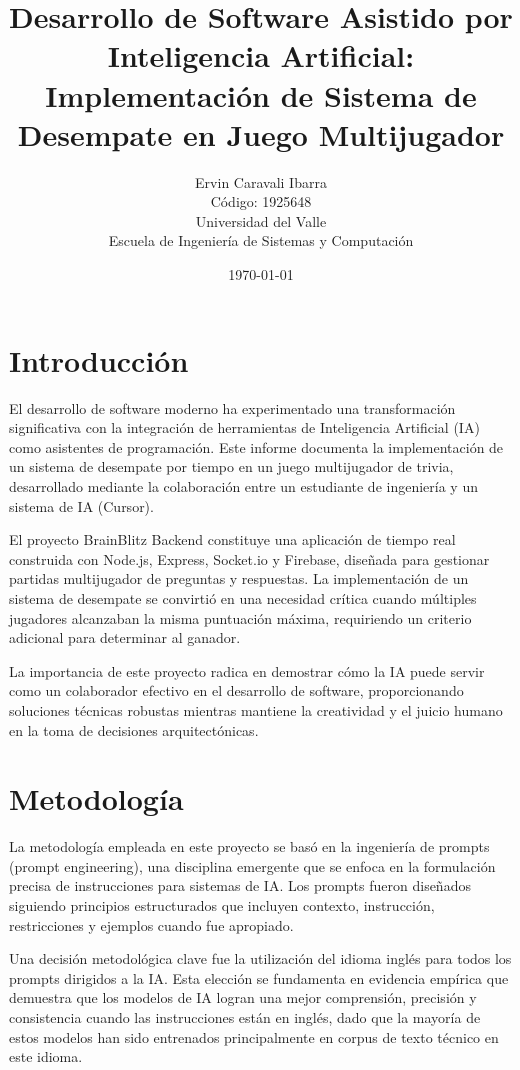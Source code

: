 \documentclass[12pt,a4paper]{article}
\title{\textbf{Desarrollo de Software Asistido por Inteligencia Artificial:\\
Implementación de Sistema de Desempate en Juego Multijugador}}
\author{Ervin Caravali Ibarra\\
Código: 1925648\\
Universidad del Valle\\
Escuela de Ingeniería de Sistemas y Computación}
\date{\today}
\begin{document}
\maketitle

\section{Introducción}

El desarrollo de software moderno ha experimentado una transformación significativa con la integración de herramientas de Inteligencia Artificial (IA) como asistentes de programación. Este informe documenta la implementación de un sistema de desempate por tiempo en un juego multijugador de trivia, desarrollado mediante la colaboración entre un estudiante de ingeniería y un sistema de IA (Cursor).

El proyecto BrainBlitz Backend constituye una aplicación de tiempo real construida con Node.js, Express, Socket.io y Firebase, diseñada para gestionar partidas multijugador de preguntas y respuestas. La implementación de un sistema de desempate se convirtió en una necesidad crítica cuando múltiples jugadores alcanzaban la misma puntuación máxima, requiriendo un criterio adicional para determinar al ganador.

La importancia de este proyecto radica en demostrar cómo la IA puede servir como un colaborador efectivo en el desarrollo de software, proporcionando soluciones técnicas robustas mientras mantiene la creatividad y el juicio humano en la toma de decisiones arquitectónicas.

\section{Metodología}

La metodología empleada en este proyecto se basó en la ingeniería de prompts (prompt engineering), una disciplina emergente que se enfoca en la formulación precisa de instrucciones para sistemas de IA. Los prompts fueron diseñados siguiendo principios estructurados que incluyen contexto, instrucción, restricciones y ejemplos cuando fue apropiado.

Una decisión metodológica clave fue la utilización del idioma inglés para todos los prompts dirigidos a la IA. Esta elección se fundamenta en evidencia empírica que demuestra que los modelos de IA logran una mejor comprensión, precisión y consistencia cuando las instrucciones están en inglés, dado que la mayoría de estos modelos han sido entrenados principalmente en corpus de texto técnico en este idioma.
\end{document}
